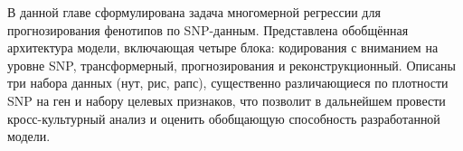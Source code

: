 В данной главе сформулирована задача многомерной регрессии для прогнозирования фенотипов по SNP-данным. Представлена обобщённая архитектура модели, включающая четыре блока: кодирования с вниманием на уровне SNP, трансформерный, прогнозирования и реконструкционный. Описаны три набора данных (нут, рис, рапс), существенно различающиеся по плотности SNP на ген и набору целевых признаков, что позволит в дальнейшем провести кросс-культурный анализ и оценить обобщающую способность разработанной модели.


%
